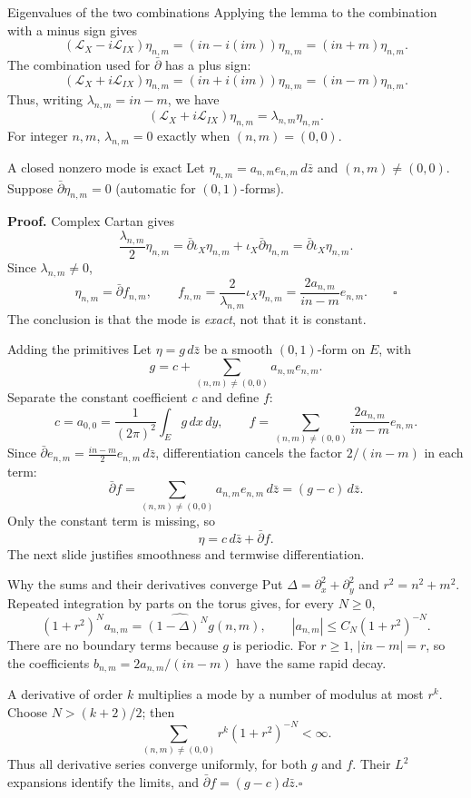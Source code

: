 \documentclass[aspectratio=169,11pt]{beamer}
\newcommand{\db}{\bar\partial}
\newcommand{\Lie}{\mathcal L}
\newcommand{\ee}{e_{n,m}}
\begin{document}
\begin{frame}{Eigenvalues of the two combinations}
Applying the lemma to the combination with a minus sign gives
\[
 (\Lie_X-i\Lie_{IX})\eta_{n,m}
 =(in-i(im))\eta_{n,m}=(in+m)\eta_{n,m}.
\]
The combination used for $\db$ has a plus sign:
\[
 (\Lie_X+i\Lie_{IX})\eta_{n,m}
 =(in+i(im))\eta_{n,m}=(in-m)\eta_{n,m}.
\]
Thus, writing $\lambda_{n,m}=in-m$, we have
\[
 (\Lie_X+i\Lie_{IX})\eta_{n,m}
 =\lambda_{n,m}\eta_{n,m}.
\]
For integer $n,m$, $\lambda_{n,m}=0$ exactly when $(n,m)=(0,0)$.
\end{frame}

\begin{frame}{A closed nonzero mode is exact}
Let $\eta_{n,m}=a_{n,m}\ee\,d\bar z$ and $(n,m)\ne(0,0)$.
Suppose $\db\eta_{n,m}=0$ (automatic for $(0,1)$-forms).

\textbf{Proof.} Complex Cartan gives
\[
 \frac{\lambda_{n,m}}2\eta_{n,m}
 =\db\iota_X\eta_{n,m}+\iota_X\db\eta_{n,m}
 =\db\iota_X\eta_{n,m}.
\]
Since $\lambda_{n,m}\ne0$,
\[
 \eta_{n,m}=\db f_{n,m},\qquad
 f_{n,m}=\frac{2}{\lambda_{n,m}}\iota_X\eta_{n,m}
 =\frac{2a_{n,m}}{in-m}\ee.\qquad\square
\]
The conclusion is that the mode is \emph{exact}, not that it is constant.
\end{frame}

\begin{frame}{Adding the primitives}
Let $\eta=g\,d\bar z$ be a smooth $(0,1)$-form on $E$, with
\[
 g=c+\sum_{(n,m)\ne(0,0)}a_{n,m}\ee.
\]
Separate the constant coefficient $c$ and define $f$:
\[
 c=a_{0,0}=\frac1{(2\pi)^2}\int_E g\,dx\,dy,\qquad
 f=\sum_{(n,m)\ne(0,0)}\frac{2a_{n,m}}{in-m}\ee.
\]
Since $\db\ee=\tfrac{in-m}{2}\ee\,d\bar z$,
differentiation cancels the factor $2/(in-m)$ in each term:
\[
 \db f=\sum_{(n,m)\ne(0,0)}a_{n,m}\ee\,d\bar z
 =(g-c)\,d\bar z.
\]
Only the constant term is missing, so
\[
 \boxed{\eta=c\,d\bar z+\db f.}
\]
The next slide justifies smoothness and termwise differentiation.
\end{frame}

\begin{frame}{Why the sums and their derivatives converge}
Put $\Delta=\partial_x^2+\partial_y^2$ and $r^2=n^2+m^2$.
Repeated integration by parts on the torus gives, for every $N\geq0$,
\[
 (1+r^2)^N a_{n,m}=\widehat{(1-\Delta)^N g}(n,m),
 \qquad |a_{n,m}|\leq C_N(1+r^2)^{-N}.
\]
There are no boundary terms because $g$ is periodic.
For $r\geq1$, $|in-m|=r$, so the coefficients
$b_{n,m}=2a_{n,m}/(in-m)$ have the same rapid decay.

A derivative of order $k$ multiplies a mode by a number of modulus at most
$r^k$. Choose $N>(k+2)/2$; then
\[
 \sum_{(n,m)\ne(0,0)} r^k(1+r^2)^{-N}<\infty.
\]
Thus all derivative series converge uniformly, for both $g$ and $f$.
Their $L^2$ expansions identify the limits, and $\db f=(g-c)d\bar z$.\hfill$\square$
\end{frame}
\end{document}
